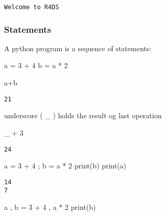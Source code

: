 \documentclass[
  letterpaper,
  DIV=11,
  numbers=noendperiod]{scrreprt}
\newenvironment{Shaded}{\begin{snugshade}}{\end{snugshade}}
\newcommand{\BuiltInTok}[1]{\textcolor[rgb]{0.00,0.46,0.62}{#1}}
\newcommand{\DecValTok}[1]{\textcolor[rgb]{0.68,0.00,0.00}{#1}}
\newcommand{\NormalTok}[1]{\textcolor[rgb]{0.00,0.46,0.62}{#1}}
\newcommand{\OperatorTok}[1]{\textcolor[rgb]{0.37,0.37,0.37}{#1}}
\begin{document}
\begin{verbatim}
Welcome to R4DS
\end{verbatim}

\hypertarget{statements}{%
\subsubsection{Statements}\label{statements}}

A python program is a sequence of statements:

\begin{Shaded}
\begin{Highlighting}[]
\NormalTok{a }\OperatorTok{=} \DecValTok{3} \OperatorTok{+} \DecValTok{4}
\NormalTok{b }\OperatorTok{=}\NormalTok{ a }\OperatorTok{*} \DecValTok{2}

\NormalTok{a}\OperatorTok{+}\NormalTok{b}
\end{Highlighting}
\end{Shaded}

\begin{verbatim}
21
\end{verbatim}

underscore ( \_ ) holds the result og last operation

\begin{Shaded}
\begin{Highlighting}[]
\NormalTok{\_ }\OperatorTok{+} \DecValTok{3}
\end{Highlighting}
\end{Shaded}

\begin{verbatim}
24
\end{verbatim}

\begin{Shaded}
\begin{Highlighting}[]
\NormalTok{a }\OperatorTok{=} \DecValTok{3} \OperatorTok{+} \DecValTok{4} \OperatorTok{;}\NormalTok{ b }\OperatorTok{=}\NormalTok{ a }\OperatorTok{*} \DecValTok{2}
\BuiltInTok{print}\NormalTok{(b)}
\BuiltInTok{print}\NormalTok{(a)}
\end{Highlighting}
\end{Shaded}

\begin{verbatim}
14
7
\end{verbatim}

\begin{Shaded}
\begin{Highlighting}[]
\NormalTok{a , b }\OperatorTok{=} \DecValTok{3} \OperatorTok{+} \DecValTok{4}\NormalTok{ , a }\OperatorTok{*} \DecValTok{2}
\BuiltInTok{print}\NormalTok{(b)}
\end{Highlighting}
\end{Shaded}
\end{document}
